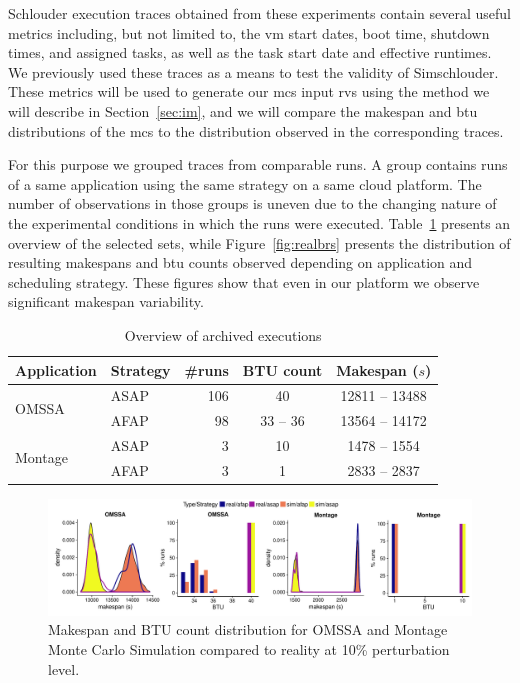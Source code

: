 \documentclass[10pt,conference,compsocconf]{IEEEtran}
\begin{document}
Schlouder  execution  traces obtained  from  these  experiments contain  several
useful metrics  including, but  not limited  to, the  \ac{vm} start  dates, boot
time, shutdown  times, and assigned  tasks, as well as  the task start  date and
effective  runtimes. We  previously used  these traces  as a  means to  test the
validity of Simschlouder.   These metrics will be used to  generate our \ac{mcs}
input \acp{rv} using the method we will describe in Section~\ref{sec:im}, and we
will compare  the makespan  and \ac{btu}  distributions of  the \ac{mcs}  to the
distribution observed in the corresponding traces.

For this purpose we grouped traces  from comparable runs.  A group contains runs
of a  same application  using the same  strategy on a  same cloud  platform. The
number of observations in  those groups is uneven due to  the changing nature of
the    experimental   conditions    in   which    the   runs    were   executed.
Table~\ref{tab:nbruns}  presents  an  overview   of  the  selected  sets,  while
Figure~\ref{fig:realbrs} presents the distribution of resulting makespans and
\ac{btu} counts observed depending on application and scheduling strategy. These
figures show that even in our platform we observe significant makespan
variability.

\begin{table} \centering \caption{Overview of archived
	executions}\label{tab:nbruns} 
	\begin{tabular}{llrcc} \toprule
		Application&Strategy&\#runs&BTU count&Makespan ($s$)\\
		\midrule 
		\multirow{2}{*}{OMSSA}&ASAP&106&40&12811 -- 13488\\
				      &AFAP&98&33 -- 36&13564 -- 14172\\ 
		\midrule 
		\multirow{2}{*}{Montage}&ASAP&3&10&1478 -- 1554\\
				        &AFAP&3&1&2833 -- 2837\\
		\bottomrule 
	\end{tabular} 
\end{table}

\begin{figure}
	\includegraphics[width=\textwidth]{gfx/fit_plot.pdf}
	\caption{Makespan and BTU count distribution for OMSSA and Montage Monte
	Carlo Simulation compared to reality at 10\% perturbation
	level.}\label{fig:fit}
\end{figure}
\end{document}
